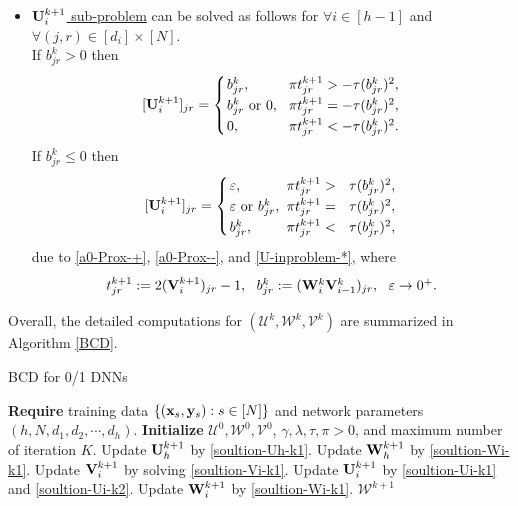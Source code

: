 \documentclass[journal]{IEEEtran}
\def\U{{\bf U}}
\def\V{{\bf V}}
\def\W{{\bf W}}
\def\CU{{\boldsymbol{\mathcal U}}}
\def\CV{{\boldsymbol{\mathcal V}}}
\def\CW{{\boldsymbol{\mathcal W}}}
\def\x{{\bf x}}
\def\y{{\bf y}}
\begin{document}
\begin{itemize}[leftmargin=10pt]
\item \underline{$\U_i^{k+1}$ sub-problem} can be solved as follows for $\forall i\in[h-1]$ and  $\forall (j,r) \in[d_i]\times[N]$. \\
If $b_{jr}^k>0$ then
\begin{eqnarray}
\label{soultion-Ui-k1}
 \arraycolsep=1.0pt\def\arraystretch{1.25}
{[\U_i^{k+1}]_{jr}}=
\left\{
\begin{array}{lll}
b_{jr}^k,& \pi t_{jr}^{k+1}>-\tau (b_{jr}^k)^2,\\
b_{jr}^k~\text{or}~0,~~&  \pi t_{jr}^{k+1} =-\tau (b_{jr}^k)^2,\\
0, &\pi t_{jr}^{k+1} <-\tau (b_{jr}^k)^2.
\end{array} \right.
\end{eqnarray}
If $b_{jr}^k\leq0$ then
\begin{eqnarray}
\label{soultion-Ui-k2}
 \arraycolsep=1.0pt\def\arraystretch{1.25}
{[\U_i^{k+1}]_{jr}}=
\left\{
\begin{array}{lll}
\varepsilon,&  \pi t_{jr}^{k+1} >~~\tau (b_{jr}^k)^2,\\
\varepsilon~\text{or}~b_{jr}^k,~& \pi t_{jr}^{k+1}=~~\tau (b_{jr}^k)^2,\\
b_{jr}^k, &\pi t_{jr}^{k+1}<~~\tau (b_{jr}^k)^2,
\end{array}\right.
\end{eqnarray}
due to \eqref{a0-Prox-+}, \eqref{a0-Prox--}, and \eqref{U-inproblem-*}, where
\begin{eqnarray*}
 \arraycolsep=1.0pt\def\arraystretch{1.25}
\begin{array}{lll}
t_{jr}^{k+1} :=  2(\V_i^{k+1})_{jr}-1,~~
 b_{jr}^k := (\W_{i}^k\V_{i-1}^k)_{jr},~~
 \varepsilon \to 0^+.
 \end{array}
\end{eqnarray*}
\end{itemize}
Overall, the detailed computations for $(\CU^{k}, \CW^{k}, \CV^k)$ are summarized in Algorithm \ref{BCD}.

 \begin{algorithm}[!th] \caption{BCD for 0/1 DNNs\label{BCD}}
	\begin{algorithmic}[1]
	\STATE \textbf{Require} training data $\{(\x_s,\y_s): s\in[N]\}$ and network parameters $(h, N, d_1,d_2,\cdots,d_h)$.
	\STATE \textbf{Initialize} $\CU^{0}, \CW^{0}, \CV^0$, $\gamma, \lambda, \tau, \pi>0$, and maximum number of iteration $K$.
	\STATE Update $\U_h^{k+1}$ by \eqref{soultion-Uh-k1}.
	\STATE Update $\W_h^{k+1}$ by \eqref{soultion-Wi-k1}.
		\STATE Update $\V_i^{k+1}$ by solving \eqref{soultion-Vi-k1}.
		\STATE Update $\U_i^{k+1}$ by \eqref{soultion-Ui-k1} and \eqref{soultion-Ui-k2}.
		\STATE Update $\W_i^{k+1}$ by \eqref{soultion-Wi-k1}.
		\ENDFOR
\ENDFOR
\RETURN $\CW^{k+1}$
	\end{algorithmic}
\end{algorithm}
 
\end{document}
